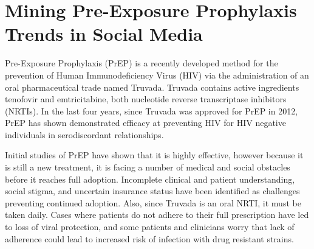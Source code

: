 


%



\section{Mining Pre-Exposure Prophylaxis Trends in Social Media}

Pre-Exposure Prophylaxis (PrEP) is a recently developed method for the prevention of Human Immunodeficiency Virus (HIV) via the administration of an oral pharmaceutical trade named Truvada. Truvada contains active ingredients tenofovir and emtricitabine, both nucleotide reverse transcriptase inhibitors (NRTIs). In the last four years, since Truvada was approved for PrEP in 2012, PrEP has shown demonstrated efficacy at preventing HIV for HIV negative individuals in serodiscordant relationships\cite{liu2014early}.

Initial studies of PrEP have shown that it is highly effective\cite{golub2013efficacy}, however because it is still a new treatment, it is facing a number of medical and social obstacles before it reaches full adoption. Incomplete clinical and patient understanding, social stigma, and uncertain insurance status have been identified as challenges preventing continued adoption\cite{calabrese2015stigma}. Also, since Truvada is an oral NRTI, it must be taken daily. Cases where patients do not adhere to their full prescription have led to loss of viral protection, and some patients and clinicians worry that lack of adherence could lead to increased risk of infection with drug resistant strains\cite{arnold2012qualitative}.

